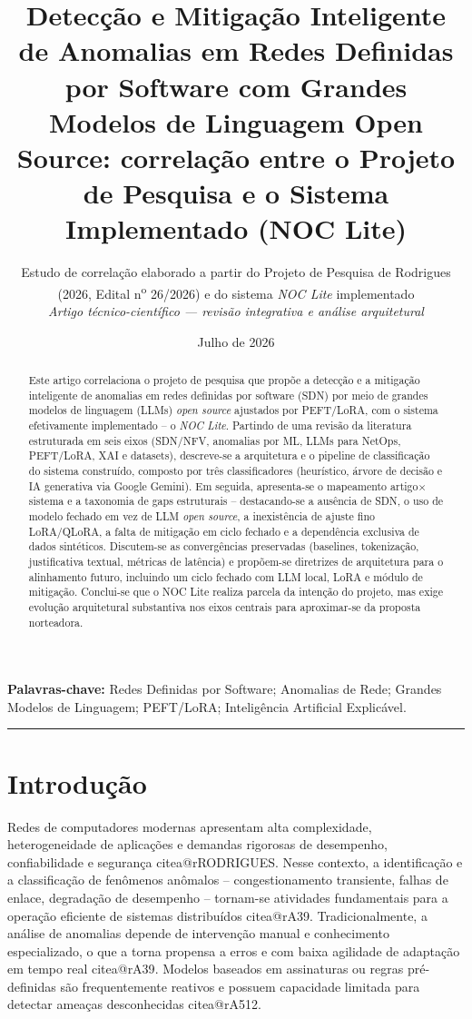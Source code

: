 \documentclass[12pt,a4paper]{article}
\title{\textbf{Detecção e Mitigação Inteligente de Anomalias em Redes
Definidas por Software com Grandes Modelos de Linguagem Open Source:
correlação entre o Projeto de Pesquisa e o Sistema Implementado (NOC Lite)}}
\author{Estudo de correlação elaborado a partir do Projeto de Pesquisa
de \mbox{Rodrigues} (2026, Edital n\textsuperscript{o} 26/2026) e do
sistema \textit{NOC Lite} implementado \\[2mm]
\textit{Artigo técnico-científico — revisão integrativa e análise arquitetural}}
\date{Julho de 2026}
\makeatletter
\newcommand{\citea}[1]{\begingroup\edef\@currentlabel{\csname citea@#1\endcsname}\@currentlabel\endgroup}
\makeatother
\begin{document}
\maketitle

\begin{abstract}
Este artigo correlaciona o projeto de pesquisa que propõe a detecção e a
mitigação inteligente de anomalias em redes definidas por software (SDN) por
meio de grandes modelos de linguagem (LLMs) \textit{open source} ajustados por
PEFT/LoRA, com o sistema efetivamente implementado -- o \textit{NOC Lite}.
Partindo de uma revisão da literatura estruturada em seis eixos (SDN/NFV,
anomalias por ML, LLMs para NetOps, PEFT/LoRA, XAI e datasets), descreve-se a
arquitetura e o pipeline de classificação do sistema construído, composto por
três classificadores (heurístico, árvore de decisão e IA generativa via Google
Gemini). Em seguida, apresenta-se o mapeamento artigo$\times$sistema e a
taxonomia de gaps estruturais -- destacando-se a ausência de SDN, o uso de
modelo fechado em vez de LLM \textit{open source}, a inexistência de
ajuste fino LoRA/QLoRA, a falta de mitigação em ciclo fechado e a dependência
exclusiva de dados sintéticos. Discutem-se as convergências preservadas
(baselines, tokenização, justificativa textual, métricas de latência) e
propõem-se diretrizes de arquitetura para o alinhamento futuro, incluindo um
ciclo fechado com LLM local, LoRA e módulo de mitigação. Conclui-se que o NOC
Lite realiza parcela da intenção do projeto, mas exige evolução arquitetural
substantiva nos eixos centrais para aproximar-se da proposta norteadora.
\end{abstract}

\noindent\textbf{Palavras-chave:} Redes Definidas por Software; Anomalias de Rede;
Grandes Modelos de Linguagem; PEFT/LoRA; Inteligência Artificial Explicável.

\vspace{6pt}
\hrule
\vspace{10pt}

\section{Introdução}
\label{sec:intro}

Redes de computadores modernas apresentam alta complexidade, heterogeneidade de
aplicações e demandas rigorosas de desempenho, confiabilidade e segurança
\citea{rRODRIGUES}. Nesse contexto, a identificação e a classificação de fenômenos
anômalos -- congestionamento transiente, falhas de enlace, degradação de
desempenho -- tornam-se atividades fundamentais para a operação eficiente de
sistemas distribuídos \citea{rA39}. Tradicionalmente, a análise de anomalias depende
de intervenção manual e conhecimento especializado, o que a torna propensa a
erros e com baixa agilidade de adaptação em tempo real \citea{rA39}. Modelos baseados
em assinaturas ou regras pré-definidas são frequentemente reativos e possuem
capacidade limitada para detectar ameaças desconhecidas \citea{rA512}.
\end{document}
